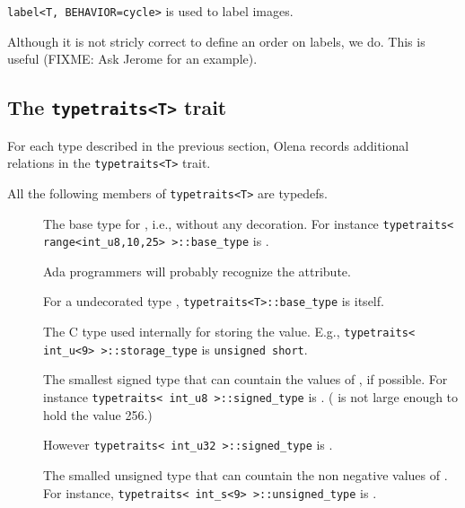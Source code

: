 \lstinline$label<T, BEHAVIOR=cycle>$ is used to label images.

Although it is not stricly correct to define an order on labels,
we do.  This is useful (FIXME: Ask Jerome for an example).

\subsection{The \lstinline$typetraits<T>$ trait}

For each type  described in the previous section, Olena
records additional relations in the \lstinline$typetraits<T>$ trait.

All the following members of \lstinline$typetraits<T>$ are typedefs.
\begin{description}
\item[] The base type for , i.e.,  without
any decoration.  For instance
\lstinline$typetraits< range<int_u8,10,25> >::base_type$
is .

Ada programmers will probably recognize the  attribute.

For a undecorated type , \lstinline$typetraits<T>::base_type$ is
 itself.

\item[] The C type used internally for storing the
value.  E.g., \lstinline$typetraits< int_u<9> >::storage_type$ is
\lstinline$unsigned short$.


\item[]
The smallest signed type that can countain the values of , if possible.
For instance
\lstinline$typetraits< int_u8 >::signed_type$ is .
( is not large enough to hold the value 256.)

However \lstinline$typetraits< int_u32 >::signed_type$ is .

\item[]
The smalled unsigned type that can countain the non negative values of
.
For instance,
\lstinline$typetraits< int_s<9> >::unsigned_type$ is .


\end{description}
